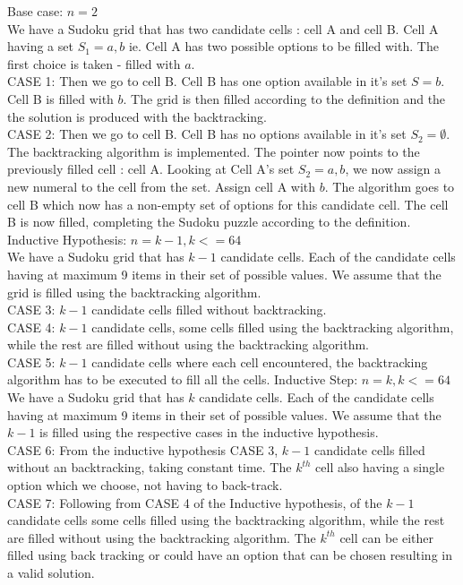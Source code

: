 \documentclass[12pt]{article}
\begin{document}
\begin{flushleft}
Base case: $n = 2$\\
We have a Sudoku grid that has two candidate cells : cell A and cell B. Cell A having a set $S_1 = {a,b}$ ie. Cell A has two possible options to be filled with. The first choice is taken - filled with $a$. \\
CASE 1: Then we go to cell B. Cell B has one option available in it's set $S = {b}$. Cell B is filled with $b$. The grid is then filled according to the definition and the the solution is produced with the backtracking.  \\
CASE 2: Then we go to cell B. Cell B has no options available in it's set $S_2 = {\emptyset}$. The backtracking algorithm is implemented. The pointer now points to the previously filled cell : cell A. Looking at Cell A's set $S_2 = {a,b}$, we now assign a new numeral to the cell from the set. Assign cell A with $b$. The algorithm goes to cell B which now has a non-empty set of options for this candidate cell. The cell B is now filled, completing the Sudoku puzzle according to the definition. 
\newline
Inductive Hypothesis: $n = k-1, k<=64$\\
We have a Sudoku grid that has $k-1$ candidate cells. Each of the candidate cells having at maximum 9 items in their set of possible values. We assume that the grid is filled using the backtracking algorithm. \\
CASE 3: $k-1$ candidate cells filled without backtracking. \\
CASE 4: $k-1$ candidate cells, some cells filled using the backtracking algorithm, while the rest are filled without using the backtracking algorithm. \\
CASE 5: $k-1$ candidate cells where each cell encountered, the backtracking algorithm has to be executed to fill all the cells. 
\newline
Inductive Step: $n = k, k<=64$\\
We have a Sudoku grid that has $k$ candidate cells. Each of the candidate cells having at maximum 9 items in their set of possible values. We assume that the $k-1$ is filled using the respective cases in the inductive hypothesis. \\
CASE 6: From the inductive hypothesis CASE 3, $k-1$ candidate cells filled without an backtracking, taking constant time. The $k^{th}$ cell also having a single option which we choose, not having to back-track.  \\
CASE 7: Following from CASE 4 of the Inductive hypothesis, of the $k-1$ candidate cells some cells filled using the backtracking algorithm, while the rest are filled without using the backtracking algorithm. The $k^{th}$ cell can be either filled using back tracking or could have an option that can be chosen resulting in a valid solution. \\

\end{flushleft}
\end{document}
